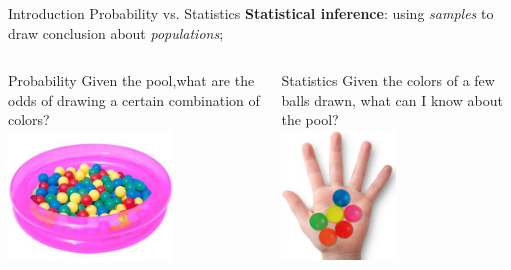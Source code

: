\documentclass[t]{beamer}
\begin{document}

\begin{ftst}
{Introduction}
{Probability vs. Statistics}
\textbf{Statistical inference}: using \textit{samples} to draw conclusion about \textit{populations};

\begin{columns}[T]
	\begin{block}{Probability}
		\centering Given the pool,what are the odds of drawing a certain combination of colors?\\
		\centering \includegraphics[height=3.5cm]{../figs/ballpool.png}
	\end{block}
	\begin{block}{Statistics}
		\centering Given the colors of a few balls drawn, what can I know about the pool?\\
		\centering \includegraphics[height=3.45cm]{../figs/hand02.png}
	\end{block}
\end{columns}
\end{ftst}

\end{document}

